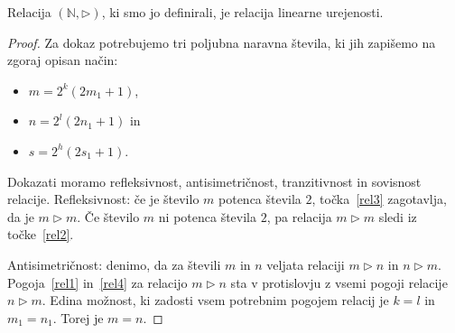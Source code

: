 \documentclass[mat2]{fmfdelo}
\newcommand{\N}{\mathbb N}
\begin{document}
\begin{trditev}
Relacija $(\N, \triangleright)$, ki smo jo definirali, je relacija linearne urejenosti.
\end{trditev}
\begin{proof}
Za dokaz potrebujemo tri poljubna naravna števila, ki jih zapišemo na zgoraj opisan način:
\begin{itemize}
\item $m= 2^k(2m_1 +1)$,
\item $n= 2^l(2n_1 +1)$ in
\item $s=2^h(2s_1+1)$.
\end{itemize}
Dokazati moramo refleksivnost, antisimetričnost, tranzitivnost in sovisnost relacije.
Refleksivnost: če je število $m$ potenca števila $2$, točka~\ref{rel3} zagotavlja, da je $m \triangleright m$. Če število $m$ ni potenca števila $2$, pa relacija $m \triangleright m$ sledi iz točke~\ref{rel2}.

Antisimetričnost: denimo, da za števili $m$ in $n$ veljata relaciji $m \triangleright n$ in $n \triangleright m$. Pogoja~\ref{rel1} in~\ref{rel4} za relacijo $m \triangleright n$ sta v protislovju z vsemi pogoji relacije $n \triangleright m$. Edina možnost, ki zadosti vsem potrebnim pogojem relacij je $k=l$ in $m_1 = n_1$. Torej je $m=n$.


\end{proof}
\end{document}
